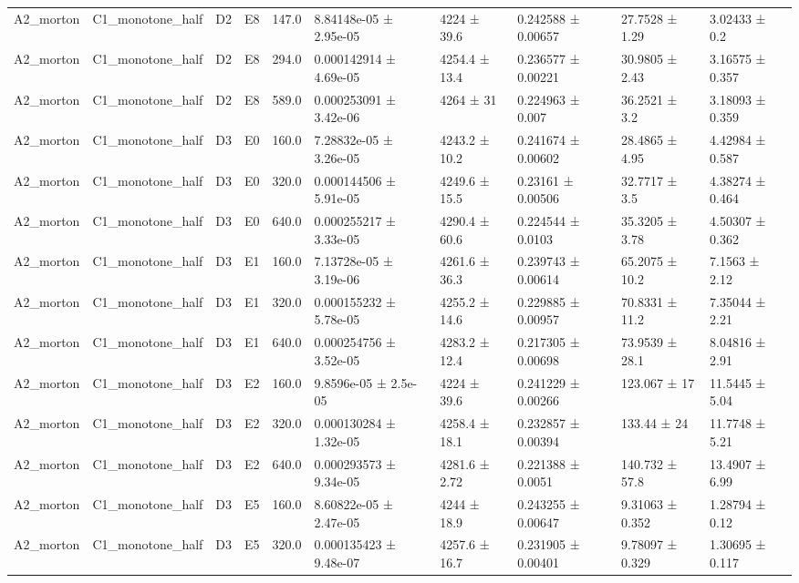 \begin{table}
\begin{tabular}{llllllllll}
A2\_morton & C1\_monotone\_half & D2 & E8 & 147.0 & 8.84148e-05 ± 2.95e-05 & 4224 ± 39.6 & 0.242588 ± 0.00657 & 27.7528 ± 1.29 & 3.02433 ± 0.2 \\
A2\_morton & C1\_monotone\_half & D2 & E8 & 294.0 & 0.000142914 ± 4.69e-05 & 4254.4 ± 13.4 & 0.236577 ± 0.00221 & 30.9805 ± 2.43 & 3.16575 ± 0.357 \\
A2\_morton & C1\_monotone\_half & D2 & E8 & 589.0 & 0.000253091 ± 3.42e-06 & 4264 ± 31 & 0.224963 ± 0.007 & 36.2521 ± 3.2 & 3.18093 ± 0.359 \\
A2\_morton & C1\_monotone\_half & D3 & E0 & 160.0 & 7.28832e-05 ± 3.26e-05 & 4243.2 ± 10.2 & 0.241674 ± 0.00602 & 28.4865 ± 4.95 & 4.42984 ± 0.587 \\
A2\_morton & C1\_monotone\_half & D3 & E0 & 320.0 & 0.000144506 ± 5.91e-05 & 4249.6 ± 15.5 & 0.23161 ± 0.00506 & 32.7717 ± 3.5 & 4.38274 ± 0.464 \\
A2\_morton & C1\_monotone\_half & D3 & E0 & 640.0 & 0.000255217 ± 3.33e-05 & 4290.4 ± 60.6 & 0.224544 ± 0.0103 & 35.3205 ± 3.78 & 4.50307 ± 0.362 \\
A2\_morton & C1\_monotone\_half & D3 & E1 & 160.0 & 7.13728e-05 ± 3.19e-06 & 4261.6 ± 36.3 & 0.239743 ± 0.00614 & 65.2075 ± 10.2 & 7.1563 ± 2.12 \\
A2\_morton & C1\_monotone\_half & D3 & E1 & 320.0 & 0.000155232 ± 5.78e-05 & 4255.2 ± 14.6 & 0.229885 ± 0.00957 & 70.8331 ± 11.2 & 7.35044 ± 2.21 \\
A2\_morton & C1\_monotone\_half & D3 & E1 & 640.0 & 0.000254756 ± 3.52e-05 & 4283.2 ± 12.4 & 0.217305 ± 0.00698 & 73.9539 ± 28.1 & 8.04816 ± 2.91 \\
A2\_morton & C1\_monotone\_half & D3 & E2 & 160.0 & 9.8596e-05 ± 2.5e-05 & 4224 ± 39.6 & 0.241229 ± 0.00266 & 123.067 ± 17 & 11.5445 ± 5.04 \\
A2\_morton & C1\_monotone\_half & D3 & E2 & 320.0 & 0.000130284 ± 1.32e-05 & 4258.4 ± 18.1 & 0.232857 ± 0.00394 & 133.44 ± 24 & 11.7748 ± 5.21 \\
A2\_morton & C1\_monotone\_half & D3 & E2 & 640.0 & 0.000293573 ± 9.34e-05 & 4281.6 ± 2.72 & 0.221388 ± 0.0051 & 140.732 ± 57.8 & 13.4907 ± 6.99 \\
A2\_morton & C1\_monotone\_half & D3 & E5 & 160.0 & 8.60822e-05 ± 2.47e-05 & 4244 ± 18.9 & 0.243255 ± 0.00647 & 9.31063 ± 0.352 & 1.28794 ± 0.12 \\
A2\_morton & C1\_monotone\_half & D3 & E5 & 320.0 & 0.000135423 ± 9.48e-07 & 4257.6 ± 16.7 & 0.231905 ± 0.00401 & 9.78097 ± 0.329 & 1.30695 ± 0.117 \\

\end{tabular}
\end{table}
